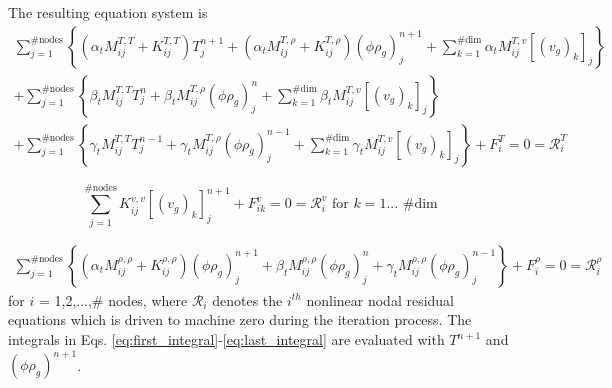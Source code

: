 The resulting equation system is
\begin{multline}
  \sum_{j=1}^{\text{\# nodes}} \left\{ \left(\alpha_t M^{T,T}_{ij} + K^{T,T}_{ij} \right) T^{n+1}_j  + \left( \alpha_t M^{T,\rho}_{ij} +  K^{T,\rho}_{ij} \right) \left( \phi \rho_{g} \right)^{n+1}_{j} + \sum_{k=1}^{\text{\# dim}} \alpha_t M^{T,v}_{ij} \left[\left(v_{g}\right)_{k}\right]_{j} \right\}
  \\ + \sum_{j=1}^{\text{\# nodes}} \left\{\beta_t M^{T,T}_{ij}  T^{n}_j   + \beta_t  M^{T,\rho}_{ij}    \left( \phi \rho_{g} \right)^{n}_{j}   + \sum_{k=1}^{\text{\# dim}} \beta_t  M^{T,v}_{ij} \left[\left(v_{g}\right)_{k}\right]_{j}     \right\} 
  \\ + \sum_{j=1}^{\text{\# nodes}} \left\{\gamma_t M^{T,T}_{ij} T^{n-1}_j + \gamma_t M^{T,\rho}_{ij} \left( \phi \rho_{g} \right)^{n-1}_{j} + \sum_{k=1}^{\text{\# dim}} \gamma_t M^{T,v}_{ij} \left[\left(v_{g}\right)_{k}\right]_{j}   \right\} + F^{T}_{i} = 0 = \mathcal{R}^{T}_{i}
  \label{eq:abl_energy_time_int}
\end{multline}
 
\begin{equation}
  \sum_{j=1}^{\text{\# nodes}} K^{v,v}_{ij} \left[\left(v_{g}\right)_{k}\right]_{j}^{n+1} + F^{v}_{ik} = 0 = \mathcal{R}^{v}_{i} \text{ for $k = 1...$ \# dim}
  \label{eq:abl_momentum_time_int}
\end{equation}

\begin{multline}
  \sum_{j=1}^{\text{\# nodes}} \left\{\left(\alpha_t M^{\rho,\rho}_{ij} + K^{\rho,\rho}_{ij} \right) \left( \phi \rho_{g} \right)^{n+1}_{j} +
  \beta_t M^{\rho,\rho}_{ij} \left( \phi \rho_{g} \right)^{n}_{j} + 
      \gamma_t M^{\rho,\rho}_{ij} \left( \phi \rho_{g} \right)^{n-1}_{j}\right\} + F^{\rho}_{i} = 0 = \mathcal{R}^{\rho}_{i}
  \label{eq:abl_gas_time_int}
\end{multline}
for $i$ = 1,2,...,\# nodes, where $\mathcal{R}_{i}$ denotes the $i^{th}$ nonlinear nodal residual equations which is driven to machine zero during the iteration process.  The integrals in Eqs. \ref{eq:first_integral}-\ref{eq:last_integral} are evaluated with $T^{n+1}$ and $\left( \phi \rho_{g} \right)^{n+1}$.

